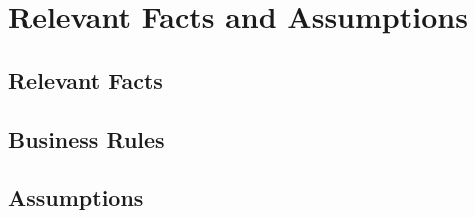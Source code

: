 \chapter{Relevant Facts and Assumptions}

\section{Relevant Facts}

\section{Business Rules}

\section{Assumptions}